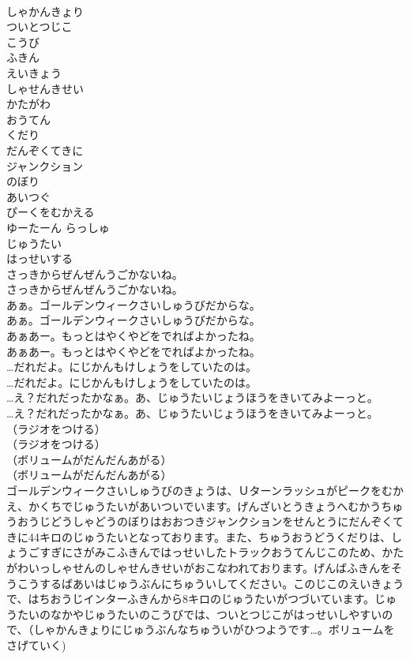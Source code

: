 \documentclass[8pt]{extreport}
\begin{document}
\begin{CJK}{UTF8}{min}
\\	しゃかんきょり
\\	ついとつじこ
\\	こうび
\\	ふきん
\\	えいきょう
\\	しゃせんきせい
\\	かたがわ
\\	おうてん
\\	くだり
\\	だんぞくてきに
\\	ジャンクション
\\	のぼり
\\	あいつぐ
\\	ぴーくをむかえる
\\	ゆーたーん らっしゅ
\\	じゅうたい
\\	はっせいする
\\	さっきからぜんぜんうごかないね。
\\	さっきからぜんぜんうごかないね。
\\	あぁ。ゴールデンウィークさいしゅうびだからな。
\\	あぁ。ゴールデンウィークさいしゅうびだからな。
\\	あぁあー。もっとはやくやどをでればよかったね。
\\	あぁあー。もっとはやくやどをでればよかったね。
\\	…だれだよ。にじかんもけしょうをしていたのは。
\\	…だれだよ。にじかんもけしょうをしていたのは。
\\	…え？だれだったかなぁ。あ、じゅうたいじょうほうをきいてみよーっと。
\\	…え？だれだったかなぁ。あ、じゅうたいじょうほうをきいてみよーっと。
\\	（ラジオをつける）
\\	（ラジオをつける）
\\	（ボリュームがだんだんあがる）
\\	（ボリュームがだんだんあがる）
\\	ゴールデンウィークさいしゅうびのきょうは、Ｕターンラッシュがピークをむかえ、かくちでじゅうたいがあいついでいます。げんざいとうきょうへむかうちゅうおうじどうしゃどうのぼりはおおつきジャンクションをせんとうにだんぞくてきに44キロのじゅうたいとなっております。また、ちゅうおうどうくだりは、しょうごすぎにさがみこふきんではっせいしたトラックおうてんじこのため、かたがわいっしゃせんのしゃせんきせいがおこなわれております。げんばふきんをそうこうするばあいはじゅうぶんにちゅういしてください。このじこのえいきょうで、はちおうじインターふきんから8キロのじゅうたいがつづいています。じゅうたいのなかやじゅうたいのこうびでは、ついとつじこがはっせいしやすいので、（しゃかんきょりにじゅうぶんなちゅういがひつようです…。ボリュームをさげていく)

\end{CJK}
\end{document}
